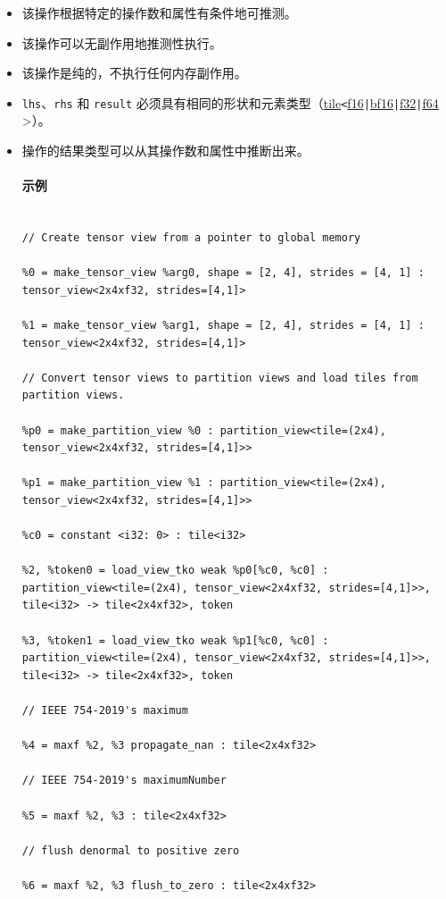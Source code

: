 \documentclass{article}
\begin{document}
\begin{itemize}
\item 该操作根据特定的操作数和属性有条件地可推测。
\item 该操作可以无副作用地推测性执行。
\item 该操作是纯的，不执行任何内存副作用。
\item \texttt{lhs}、\texttt{rhs} 和 \texttt{result} 必须具有相同的形状和元素类型（\href{https://docs.nvidia.com/cuda/tile-ir/latest/sections/types.html#type-tile}{tile}\texttt{<}\href{https://docs.nvidia.com/cuda/tile-ir/latest/sections/types.html#subsection-element-types}{f16}\texttt{|}\href{https://docs.nvidia.com/cuda/tile-ir/latest/sections/types.html#subsection-element-types}{bf16}\texttt{|}\href{https://docs.nvidia.com/cuda/tile-ir/latest/sections/types.html#subsection-element-types}{f32}\texttt{|}\href{https://docs.nvidia.com/cuda/tile-ir/latest/sections/types.html#subsection-element-types}{f64} >）。
\item 操作的结果类型可以从其操作数和属性中推断出来。




\paragraph{示例}


\begin{lstlisting}

// Create tensor view from a pointer to global memory

%0 = make_tensor_view %arg0, shape = [2, 4], strides = [4, 1] : tensor_view<2x4xf32, strides=[4,1]>

%1 = make_tensor_view %arg1, shape = [2, 4], strides = [4, 1] : tensor_view<2x4xf32, strides=[4,1]>

// Convert tensor views to partition views and load tiles from partition views.

%p0 = make_partition_view %0 : partition_view<tile=(2x4), tensor_view<2x4xf32, strides=[4,1]>>

%p1 = make_partition_view %1 : partition_view<tile=(2x4), tensor_view<2x4xf32, strides=[4,1]>>

%c0 = constant <i32: 0> : tile<i32>

%2, %token0 = load_view_tko weak %p0[%c0, %c0] : partition_view<tile=(2x4), tensor_view<2x4xf32, strides=[4,1]>>, tile<i32> -> tile<2x4xf32>, token

%3, %token1 = load_view_tko weak %p1[%c0, %c0] : partition_view<tile=(2x4), tensor_view<2x4xf32, strides=[4,1]>>, tile<i32> -> tile<2x4xf32>, token

// IEEE 754-2019's maximum

%4 = maxf %2, %3 propagate_nan : tile<2x4xf32>

// IEEE 754-2019's maximumNumber

%5 = maxf %2, %3 : tile<2x4xf32>

// flush denormal to positive zero

%6 = maxf %2, %3 flush_to_zero : tile<2x4xf32>

\end{lstlisting}



\end{itemize}
\end{document}
